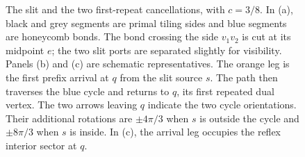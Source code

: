 \begin{figure}[t]
\caption{The slit and the two first-repeat cancellations, with $c=3/8$.
In (a), black and grey segments are primal tiling sides and blue segments
are honeycomb bonds. The bond crossing the side $v_1v_2$ is cut at its
midpoint $e$; the two slit ports are separated slightly for visibility.
Panels (b) and (c) are schematic representatives. The orange leg is
the first prefix arrival at $q$ from the slit source $s$. The path then
traverses the blue cycle and returns to $q$, its first repeated dual
vertex. The two arrows leaving $q$ indicate the two cycle
orientations. Their additional rotations are $\pm4\pi/3$ when $s$ is
outside the cycle and $\pm8\pi/3$ when $s$ is inside. In (c), the arrival
leg occupies the reflex interior sector at $q$.}
\label{fig:slit}
\end{figure}
